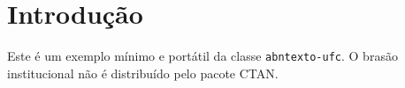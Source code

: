 \documentclass{abntexto-ufc}
\begin{document}
\ufcPrintCover
\ufcPrintTitlePage

\section{Introdução}

Este é um exemplo mínimo e portátil da classe \texttt{abntexto-ufc}.
O brasão institucional não é distribuído pelo pacote CTAN.
\end{document}
